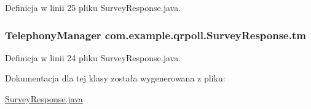 Definicja w linii 25 pliku Survey\+Response.\+java.

\hypertarget{classcom_1_1example_1_1qrpoll_1_1_survey_response_ad4ac570c04a756ac4eaa8622186d5933}{
\subsubsection[{tm}]{\setlength{\rightskip}{0pt plus 5cm}Telephony\+Manager com.\+example.\+qrpoll.\+Survey\+Response.\+tm\hspace{0.3cm}{\ttfamily [private]}}}\label{classcom_1_1example_1_1qrpoll_1_1_survey_response_ad4ac570c04a756ac4eaa8622186d5933}


Definicja w linii 24 pliku Survey\+Response.\+java.



Dokumentacja dla tej klasy została wygenerowana z pliku\+:\begin{DoxyCompactItemize}
\item 
\hyperlink{_survey_response_8java}{Survey\+Response.\+java}\end{DoxyCompactItemize}
